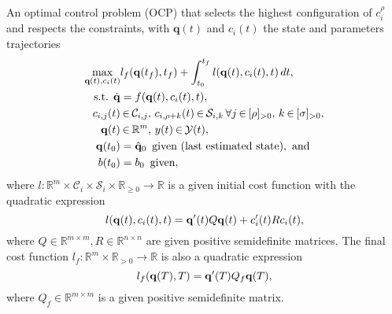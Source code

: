 \documentclass[letterpaper,10pt,journal,twoside]{IEEEtran}
\theoremstyle{definition}
\begin{document}
An optimal control problem (OCP) that selects the highest configuration of {\color{blue} $c_i^\rho$} and respects the constraints, with $\mathbf{q}(t)$ and $c_i(t)$ the state and parameters trajectories
\begin{subequations}\label{eq:ocp-output-mpc}\begin{align}
  \max_{\mathbf{q}(t),c_i(t)}&{l_f(\mathbf{q}(t_f),t_f)+\int_{t_0}^{t_f}{l(\mathbf{q}(t),c_i(t),t)\,dt}},\label{eq:ocp-costs}\\
  \text{s.t. }\dot{\mathbf{q}}&=f(\mathbf{q}(t),c_i(t),t),\label{eq:dyn-evol}\\
  c_{i,j}(t)&\hspace*{-.2ex}\in\hspace*{-.2ex}\mathcal{C}_{i,j},\,c_{i,\rho+k}(t)\hspace*{-.2ex}\in\hspace*{-.2ex}\mathcal{S}_{i,k}\,\forall j\hspace*{-.2ex}\in\hspace*{-.2ex}[\rho]_{>0},\,k\hspace*{-.2ex}\in\hspace*{-.2ex}[\sigma]_{>0},\label{eq:state-cont-const-mpc}\\
  \mathbf{q}(t)&\hspace*{-.2ex}\in\hspace*{-.2ex}\mathbb{R}^m,\,y(t)\hspace*{-.2ex}\in\hspace*{-.2ex}\mathcal{Y}(t),\label{eq:batt-const-mpc}\\
  \mathbf{q}(t_0)&=\hat{\mathbf{q}}_0\,\,\,\text{given (last estimated state)},\text{ and}\label{eq:ocp-outp-mpc-state-est}\\
  b(t_0)&=b_0\,\,\,\text{given}\label{eq:ocp-outp-bat},
\end{align}\end{subequations}
where $l:\mathbb{R}^m\times\mathcal{C}_i\times\mathcal{S}_i\times\mathbb{R}_{\geq 0}\rightarrow\mathbb{R}$ is a given initial cost function with the quadratic expression
\vspace*{-.5ex}
\begin{equation}\label{eq:insta-cost-mpc}
  l(\mathbf{q}(t),c_i(t),t)=\mathbf{q}'(t)Q\mathbf{q}(t)+c_i'(t)Rc_i(t),
  \vspace*{-.5ex}
\end{equation}
where $Q\in\mathbb{R}^{m\times m},R\in\mathbb{R}^{n\times n}$ are given positive semidefinite matrices.%
The final cost function $l_f:\mathbb{R}^m\times\mathbb{R}_{> 0}\rightarrow\mathbb{R}$ is also a quadratic expression %
\vspace*{-.5ex}
\begin{equation}\label{eq:final-cost-mpc}
  l_f(\mathbf{q}(T),T)=\mathbf{q}'(T)Q_f\mathbf{q}(T), 
  \vspace*{-.5ex}
\end{equation}
where $Q_f\in\mathbb{R}^{m\times m}$ is a given positive semidefinite matrix.
\end{document}
